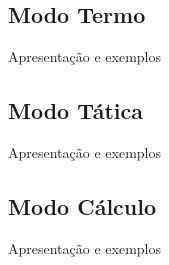 \subsection{Modo Termo}
Apresentação e exemplos

\subsection{Modo Tática}
Apresentação e exemplos

\subsection{Modo Cálculo}
Apresentação e exemplos

